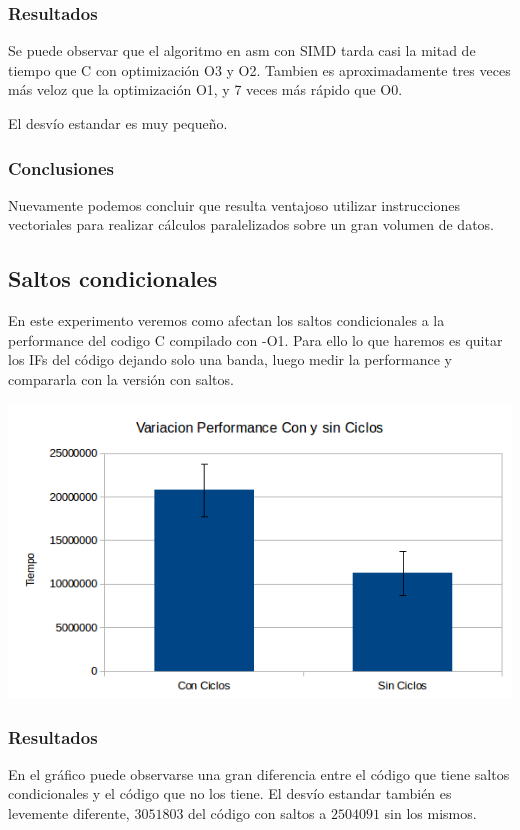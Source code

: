 \documentclass[a4paper]{article}
\begin{document}
\subsubsection{Resultados}
Se puede observar que el algoritmo en asm con SIMD tarda casi la mitad de tiempo que C con optimización O3 y O2. Tambien es aproximadamente tres veces más veloz que la optimización O1, y 7 veces más rápido que O0.

El desvío estandar es muy pequeño.

\subsubsection{Conclusiones}

Nuevamente podemos concluir que resulta ventajoso utilizar instrucciones vectoriales para realizar cálculos paralelizados sobre un gran volumen de datos.

\newpage
\subsection{Saltos condicionales}

En este experimento veremos como afectan los saltos condicionales a la performance del codigo C compilado con -O1. Para ello lo que haremos es quitar los IFs del código dejando solo una banda, luego medir la performance y compararla con la versión con saltos.


  \begin{center}
  \includegraphics[scale=0.66]{Graficos3.1/per.png}
  \end{center}

\subsubsection{Resultados}
En el gráfico puede observarse una gran diferencia entre el código que tiene saltos condicionales y el código que no los tiene. El desvío estandar también es levemente diferente, $3051803$ del código con saltos a $2504091$ sin los mismos.
\end{document}

